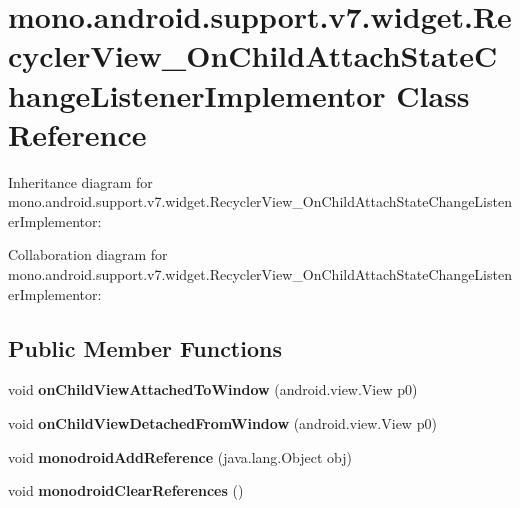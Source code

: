 \hypertarget{classmono_1_1android_1_1support_1_1v7_1_1widget_1_1_recycler_view___on_child_attach_state_change_listener_implementor}{}\section{mono.\+android.\+support.\+v7.\+widget.\+Recycler\+View\+\_\+\+On\+Child\+Attach\+State\+Change\+Listener\+Implementor Class Reference}
\label{classmono_1_1android_1_1support_1_1v7_1_1widget_1_1_recycler_view___on_child_attach_state_change_listener_implementor}


Inheritance diagram for mono.\+android.\+support.\+v7.\+widget.\+Recycler\+View\+\_\+\+On\+Child\+Attach\+State\+Change\+Listener\+Implementor\+:


Collaboration diagram for mono.\+android.\+support.\+v7.\+widget.\+Recycler\+View\+\_\+\+On\+Child\+Attach\+State\+Change\+Listener\+Implementor\+:
\subsection*{Public Member Functions}
\begin{DoxyCompactItemize}
\item 
\mbox{\label{classmono_1_1android_1_1support_1_1v7_1_1widget_1_1_recycler_view___on_child_attach_state_change_listener_implementor_adebfa7ea1dc476b00843dfd0752671ed}} 
void {\bfseries on\+Child\+View\+Attached\+To\+Window} (android.\+view.\+View p0)
\item 
\mbox{\label{classmono_1_1android_1_1support_1_1v7_1_1widget_1_1_recycler_view___on_child_attach_state_change_listener_implementor_af970163379808ec9a1e6bc73356a3d39}} 
void {\bfseries on\+Child\+View\+Detached\+From\+Window} (android.\+view.\+View p0)
\item 
\mbox{\label{classmono_1_1android_1_1support_1_1v7_1_1widget_1_1_recycler_view___on_child_attach_state_change_listener_implementor_a2cc613938339013be1dc352e67471797}} 
void {\bfseries monodroid\+Add\+Reference} (java.\+lang.\+Object obj)
\item 
\mbox{\label{classmono_1_1android_1_1support_1_1v7_1_1widget_1_1_recycler_view___on_child_attach_state_change_listener_implementor_ac8afdd86efc6fd6f205811277b854a49}} 
void {\bfseries monodroid\+Clear\+References} ()
\end{DoxyCompactItemize}
